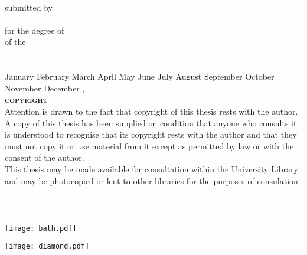 \documentclass[
11pt, %
chapterinoneline,%
english, %
singlespacing, %
headsepline, %
]{MastersDoctoralThesis} %
\author{Andrew R. McCluskey} %
\newcommand{\MONTH}{%
	\ifcase\the\month
	\or January%
	\or February%
	\or March%
	\or April%
	\or May%
	\or June%
	\or July%
	\or August%
	\or September%
	\or October%
	\or November%
	\or December%
	\fi}
\begin{document}
\frontmatter %

\pagestyle{plain} %


\begin{titlepage}
\begin{center}
\doublespacing

{\huge \bfseries \ttitle}\\
\vspace{0.4cm} %
submitted by \\
\vspace{0.1cm}
\text{\huge \authorname} \\
\vspace{0.2cm}
for the degree of \degreename \\
\vspace{0.1cm}
of the \\
\vspace{0.2cm}
{\scshape\LARGE \univname} \\
\vspace{0.1cm}
\deptname \\
\vspace{0.5cm}
\MONTH, \the\year \\
\vspace{1.cm}
{\scshape \bfseries copyright} \\
Attention is drawn to the fact that copyright of this thesis rests with the author. A copy of this thesis has been supplied on condition that anyone who consults it is understood to recognise that its copyright rests with the author and that they must not copy it or use material from it except as permitted by law or with the consent of the author. \\
\vspace{0.5cm}
This thesis may be made available for consultation within the University Library and may be photocopied or lent to other libraries for the purposes of consulation.
\vspace{1.5cm} \\
\rule[0.5em]{25em}{0.5pt} \\
\vspace{1.cm}

\begin{minipage}[t][][b]{0.4\textwidth}
\begin{flushleft}
\texttt{[image: bath.pdf]}
\end{flushleft}
\end{minipage}
\begin{minipage}[t][][b]{0.4\textwidth}
\begin{flushright}
\texttt{[image: diamond.pdf]}
\end{flushright}
\end{minipage}\\[2cm]



\end{center}
\end{titlepage}
\end{document}
